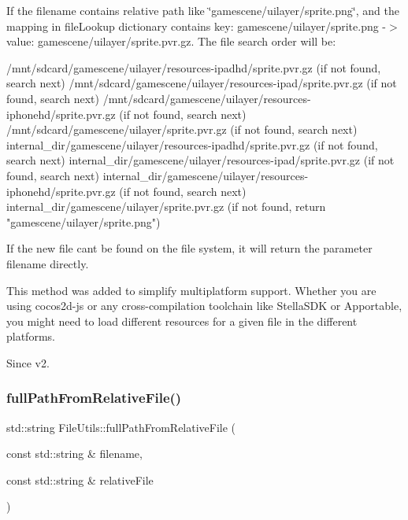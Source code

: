 If the filename contains relative path like \char`\"{}gamescene/uilayer/sprite.\+png\char`\"{}, and the mapping in file\+Lookup dictionary contains {\ttfamily key\+: gamescene/uilayer/sprite.\+png -\/$>$ value\+: gamescene/uilayer/sprite.\+pvr.\+gz}. The file search order will be\+: \begin{DoxyVerb} /mnt/sdcard/gamescene/uilayer/resources-ipadhd/sprite.pvr.gz      (if not found, search next)
 /mnt/sdcard/gamescene/uilayer/resources-ipad/sprite.pvr.gz        (if not found, search next)
 /mnt/sdcard/gamescene/uilayer/resources-iphonehd/sprite.pvr.gz    (if not found, search next)
 /mnt/sdcard/gamescene/uilayer/sprite.pvr.gz                       (if not found, search next)
 internal_dir/gamescene/uilayer/resources-ipadhd/sprite.pvr.gz     (if not found, search next)
 internal_dir/gamescene/uilayer/resources-ipad/sprite.pvr.gz       (if not found, search next)
 internal_dir/gamescene/uilayer/resources-iphonehd/sprite.pvr.gz   (if not found, search next)
 internal_dir/gamescene/uilayer/sprite.pvr.gz                      (if not found, return "gamescene/uilayer/sprite.png")
\end{DoxyVerb}


If the new file can\textquotesingle{}t be found on the file system, it will return the parameter filename directly.

This method was added to simplify multiplatform support. Whether you are using cocos2d-\/js or any cross-\/compilation toolchain like Stella\+S\+DK or Apportable, you might need to load different resources for a given file in the different platforms.

\begin{DoxySince}{Since}
v2. 
\end{DoxySince}
\mbox{\label{classFileUtils_a632933377d6c84ec2687587883e2c419}} 
\subsubsection{\texorpdfstring{full\+Path\+From\+Relative\+File()}{fullPathFromRelativeFile()}\hspace{0.1cm}{\footnotesize\ttfamily [1/2]}}
{\footnotesize\ttfamily std\+::string File\+Utils\+::full\+Path\+From\+Relative\+File (\begin{DoxyParamCaption}\item[{const std\+::string \&}]{filename,  }\item[{const std\+::string \&}]{relative\+File }\end{DoxyParamCaption})\hspace{0.3cm}{\ttfamily [virtual]}}

